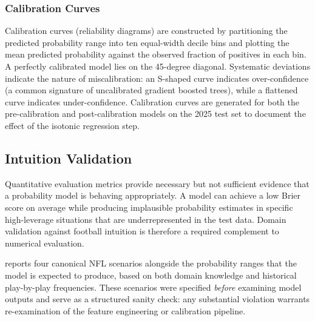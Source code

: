 \subsubsection{Calibration Curves}

Calibration curves (reliability diagrams) are constructed by partitioning the
predicted probability range into ten equal-width decile bins and plotting the
mean predicted probability against the observed fraction of positives in each
bin. A perfectly calibrated model lies on the 45-degree diagonal. Systematic
deviations indicate the nature of miscalibration: an S-shaped curve indicates
over-confidence (a common signature of uncalibrated gradient boosted trees),
while a flattened curve indicates under-confidence. Calibration curves are
generated for both the pre-calibration and post-calibration models on the 2025
test set to document the effect of the isotonic regression step.

\subsection{Intuition Validation}
\label{sec:intuition-validation}

Quantitative evaluation metrics provide necessary but not sufficient evidence
that a probability model is behaving appropriately. A model can achieve a
low Brier score on average while producing implausible probability estimates
in specific high-leverage situations that are underrepresented in the test
data. Domain validation against football intuition is therefore a required
complement to numerical evaluation.

 reports four canonical NFL scenarios alongside the
probability ranges that the \xscore{} model is expected to produce, based on
both domain knowledge and historical play-by-play frequencies. These scenarios
were specified \emph{before} examining model outputs and serve as a structured
sanity check: any substantial violation warrants re-examination of the feature
engineering or calibration pipeline.

